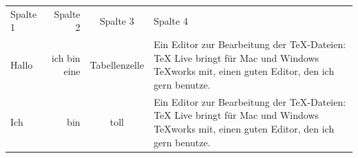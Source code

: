 \documentclass[ngerman,12pt]{scrartcl}
\begin{document}
\vspace*{1cm}

\begin{tabular}{lrcp{6cm}} \toprule[1.5pt]
Spalte 1 & Spalte 2 & Spalte 3 & Spalte 4 \\ \cmidrule[1pt](rl){1-4}
Hallo & ich bin eine & Tabellenzelle & Ein Editor zur Be\-ar\-beitung der TeX-Dateien: TeX Live bringt für Mac und Windows TeXworks mit, einen guten Editor, den ich gern benutze.  \\ \midrule[0.5pt]
Ich & bin & toll & Ein Editor zur Bearbeitung der TeX-Dateien: TeX Live bringt für Mac und Windows TeXworks mit, einen guten Editor, den ich gern benutze.  \\ \bottomrule[2.5pt]
\end{tabular}
\end{document}
